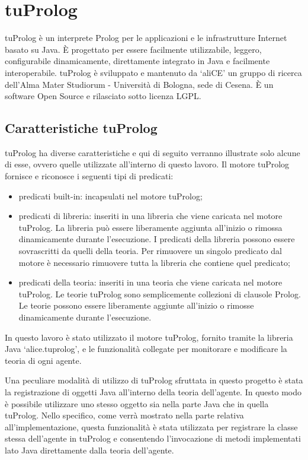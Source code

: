 \section{tuProlog}
tuProlog è un interprete Prolog per le applicazioni e le infrastrutture Internet basato su Java. \`E progettato per essere facilmente utilizzabile, leggero, configurabile dinamicamente, direttamente integrato in Java e facilmente interoperabile.
tuProlog è sviluppato e mantenuto da `aliCE' un gruppo di ricerca dell'Alma Mater Studiorum - Università di Bologna, sede di Cesena. \`E un software Open Source e rilasciato sotto licenza LGPL.

\subsection{Caratteristiche tuProlog}
tuProlog ha diverse caratteristiche e qui di seguito verranno illustrate solo alcune di esse, ovvero quelle utilizzate all'interno di questo lavoro.
Il motore tuProlog fornisce e riconosce i seguenti tipi di predicati:
\begin{itemize}
\item predicati built-in: incapsulati nel motore tuProlog;
\item predicati di libreria: inseriti in una libreria che viene caricata nel motore tuProlog. La libreria può essere liberamente aggiunta all'inizio o rimossa dinamicamente durante l'esecuzione. I predicati della libreria possono essere sovrascritti da quelli della teoria. Per rimuovere un singolo predicato dal motore è necessario rimuovere tutta la libreria che contiene quel predicato;
\item predicati della teoria: inseriti in una teoria che viene caricata nel motore tuProlog. Le teorie tuProlog sono semplicemente collezioni di clausole Prolog. Le teorie possono essere liberamente aggiunte all'inizio o rimosse dinamicamente durante l'esecuzione.
\end{itemize}

In questo lavoro è stato utilizzato il motore tuProlog, fornito tramite la libreria Java `alice.tuprolog', e le funzionalità collegate per monitorare e modificare la teoria di ogni agente.

Una peculiare modalità di utilizzo di tuProlog sfruttata in questo progetto è stata la registrazione di oggetti Java all'interno della teoria dell'agente. In questo modo è possibile utilizzare uno stesso oggetto sia nella parte Java che in quella tuProlog. Nello specifico, come verrà mostrato nella parte relativa all'implementazione, questa funzionalità è stata utilizzata per registrare la classe stessa dell'agente in tuProlog e consentendo l'invocazione di metodi implementati lato Java direttamente dalla teoria dell'agente.

